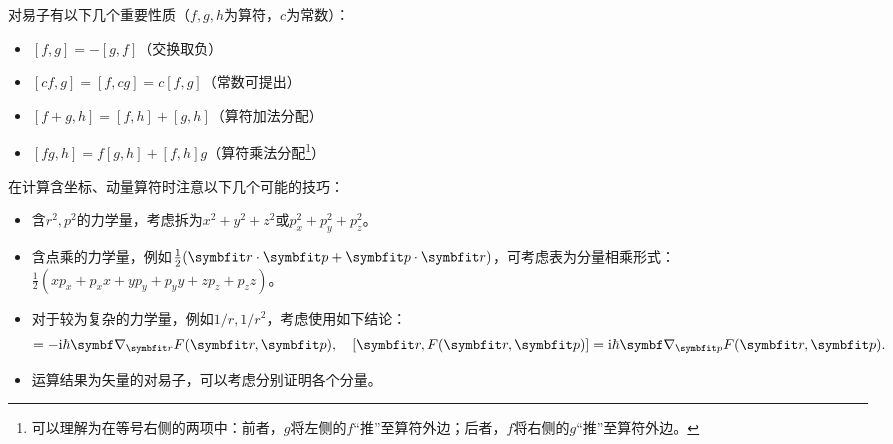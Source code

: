 \begin{tcolorbox}[breakable, colframe=blue, colback=blue!10, title={\textbf{含坐标、动量算符的对易子的计算}}]

    对易子有以下几个重要性质（$f,g,h$为算符，$c$为常数）：
    \begin{itemize}
        \item{$[f,g]=-[g,f]$\quad（交换取负）}
        \item{$[cf, g]=[f,cg]=c[f,g]$\quad （常数可提出）}
        \item{$[f+g, h]=[f,h]+[g,h]$\quad （算符加法分配）}
        \item{$[fg, h]=f[g,h]+[f,h]g$\quad （算符乘法分配\footnote{可以理解为在等号右侧的两项中：前者，$g$将左侧的$f$“推”至算符外边；后者，$f$将右侧的$g$“推”至算符外边。}）}
    \end{itemize}

    在计算含坐标、动量算符时注意以下几个可能的技巧：
    \begin{itemize}
        \item{含$r^2, p^2$的力学量，考虑拆为$x^2+y^2+z^2$或$p_x^2+p_y^2+p_z^2$。}
        \item{含点乘的力学量，例如$\frac12(\rr\cdot\pp+\pp\cdot\rr)$，可考虑表为分量相乘形式：$\frac12(x p_x + p_x x + y p_y + p_y y + z p_z + p_z z)$。}
        \item{对于较为复杂的力学量，例如$1/r, 1/r^2$，考虑使用如下结论：
            \begin{equation}
                [\pp,F(\rr,\pp)] = -\ii\hbar\del_{\rr}F(\rr,\pp),\quad [\rr,F(\rr,\pp)] = \ii\hbar\del_{\pp}F(\rr,\pp).
            \end{equation}
        }
        \item{运算结果为矢量的对易子，可以考虑分别证明各个分量。}
    \end{itemize}


\end{tcolorbox}
